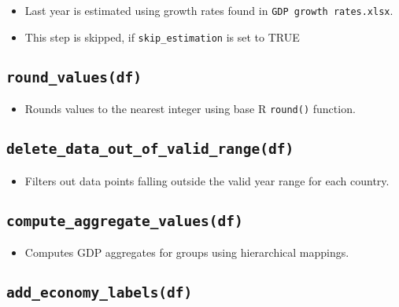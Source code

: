 \documentclass[
]{book}
\providecommand{\tightlist}{%
  \setlength{\itemsep}{0pt}\setlength{\parskip}{0pt}}
\begin{document}
\begin{itemize}
\tightlist
\item
  Last year is estimated using growth rates found in \texttt{GDP\ growth\ rates.xlsx}.
\item
  This step is skipped, if \texttt{skip\_estimation} is set to TRUE
\end{itemize}

\subsection*{\texorpdfstring{\texttt{round\_values(df)}}{round\_values(df)}}\label{round_valuesdf}

\begin{itemize}
\tightlist
\item
  Rounds values to the nearest integer using base R \texttt{round()} function.
\end{itemize}

\subsection*{\texorpdfstring{\texttt{delete\_data\_out\_of\_valid\_range(df)}}{delete\_data\_out\_of\_valid\_range(df)}}\label{delete_data_out_of_valid_rangedf}

\begin{itemize}
\tightlist
\item
  Filters out data points falling outside the valid year range for each country.
\end{itemize}

\subsection*{\texorpdfstring{\texttt{compute\_aggregate\_values(df)}}{compute\_aggregate\_values(df)}}\label{compute_aggregate_valuesdf}

\begin{itemize}
\tightlist
\item
  Computes GDP aggregates for groups using hierarchical mappings.
\end{itemize}

\subsection*{\texorpdfstring{\texttt{add\_economy\_labels(df)}}{add\_economy\_labels(df)}}\label{add_economy_labelsdf}
\end{document}
